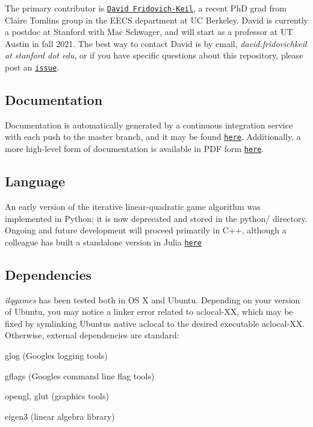 The primary contributor is \href{https://dfridovi.github.io}{\tt David Fridovich-\/\+Keil}, a recent PhD grad from Claire Tomlin\textquotesingle{}s group in the E\+E\+CS department at UC Berkeley. David is currently a postdoc at Stanford with Mac Schwager, and will start as a professor at UT Austin in fall 2021. The best way to contact David is by email, {\itshape david.\+fridovichkeil at stanford dot edu}, or if you have specific questions about this repository, please post an \href{https://github.com/HJReachability/ilqgames/issues}{\tt issue}.

\subsection*{Documentation}

Documentation is automatically generated by a continuous integration service with each push to the {\ttfamily master} branch, and it may be found \href{https://HJReachability.github.io/ilqgames/documentation/html/}{\tt here}. Additionally, a more high-\/level form of documentation is available in P\+DF form \href{https://github.com/HJReachability/ilqgames/blob/master/ILQGames_Documentation.pdf}{\tt here}.

\subsection*{Language}

An early version of the iterative linear-\/quadratic game algorithm was implemented in Python; it is now deprecated and stored in the {\ttfamily python/} directory. Ongoing and future development will proceed primarily in C++, although a colleague has built a standalone version in Julia \href{https://github.com/lassepe/iLQGames.jl}{\tt here}

\subsection*{Dependencies}

{\itshape ilqgames} has been tested both in OS X and Ubuntu. Depending on your version of Ubuntu, you may notice a linker error related to {\ttfamily aclocal-\/\+XX}, which may be fixed by symlinking Ubuntu\textquotesingle{}s native {\ttfamily aclocal} to the desired executable {\ttfamily aclocal-\/\+XX}. Otherwise, external dependencies are standard\+:


\begin{DoxyItemize}
\item {\ttfamily glog} (Google\textquotesingle{}s logging tools)
\item {\ttfamily gflags} (Google\textquotesingle{}s command line flag tools)
\item {\ttfamily opengl}, {\ttfamily glut} (graphics tools)
\item {\ttfamily eigen3} (linear algebra library)
\end{DoxyItemize}

